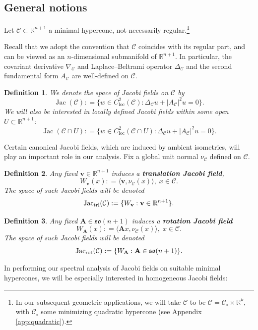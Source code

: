 \documentclass[11pt, letterpaper, reqno]{amsart}
\numberwithin{equation}{section}
\newtheorem{Def}{Definition}[section]
\theoremstyle{remark}
\newcommand{\RR}{\mathbb{R}}
\newcommand{\cC}{\mathcal{C}}
\newcommand{\mbfA}{\mathbf{A}}
\newcommand{\mbfv}{\mathbf{v}}
\newcommand{\Jac}{\operatorname{Jac}}
\newcommand{\loc}{\mathrm{loc}}
\begin{document}
\subsection{General notions}

Let $\cC \subset \RR^{n+1}$ a minimal hypercone, not necessarily regular.\footnote{In our subsequent geometric applications, we will take $\cC$ to be $\cC = \cC_\circ \times \RR^k$, with $\cC_\circ$ some minimizing quadratic hypercone (see Appendix \ref{app:quadratic}).} 

Recall that we adopt the convention that $\cC$ coincides with its regular part, and can be viewed as an $n$-dimensional submanifold of $\RR^{n+1}$. In particular, the covariant derivative $\nabla_\cC$ and Laplace--Beltrami operator $\Delta_\cC$ and the second fundamental form $A_\cC$ are well-defined on $\cC$.

\begin{Def} \label{defi:jf}
We denote the space of Jacobi fields on $\cC$ by 
  \[
  \Jac(\cC): = \{w \in C^2_\loc(\cC) : \Delta_\cC u + |A_{\cC}|^2 u = 0\}. 
  \]
We will also be interested in locally defined Jacobi fields within some open $U\subset \RR^{n+1}$:
  \[
  \Jac(\cC \cap U): = \{w \in C^2_\loc(\cC\cap U) : \Delta_\cC u + |A_{\cC}|^2 u = 0\}. 
  \]
\end{Def}

Certain canonical Jacobi fields, which are induced by ambient isometries, will play an important role in our analysis. Fix a global unit normal $\nu_\cC$ defined on $\cC$.

\begin{Def} \label{defi:translation.jf}
  Any fixed $\mbfv \in \RR^{n+1}$ induces a \textbf{translation Jacobi field},
  \[ W_\mbfv(x) : = \langle \mbfv, \nu_\cC(x) \rangle, \; x \in \cC. \]
  The space of such Jacobi fields will be denoted
  \[
  \Jac_\textnormal{trl}(\cC) : =\{W_\mbfv : \mbfv \in \RR^{n+1}\}. 
  \]
\end{Def}
  

\begin{Def} \label{defi:rotation.jf}
Any fixed $\mbfA \in \mathfrak{so}(n+1)$ induces a \textbf{rotation Jacobi field}
 \[ W_\mbfA(x) : = \langle \mbfA x, \nu_\cC(x) \rangle, \; x \in \cC. \]
 The space of such Jacobi fields will be denoted
  \[
  \Jac_\textnormal{rot}(\cC) : = \{W_\mbfA : \mbfA \in \mathfrak{so}(n+1)\}. 
  \]
\end{Def}

In performing our spectral analysis of Jacobi fields on suitable minimal hypercones, we will be especially interested in homogeneous Jacobi fields:
\end{document}
